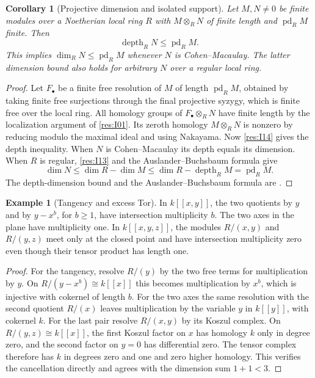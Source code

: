 \documentclass[11pt,oneside,openany]{book}
\newtheorem{corollary}[theorem]{Corollary}
\theoremstyle{definition}
\newtheorem{example}[theorem]{Example}
\theoremstyle{remark}
\begin{document}
\begin{corollary}[Projective dimension and isolated support]\label{res:I15}
Let \(M,N\ne 0\) be finite modules over a Noetherian local
ring \(R\) with \(M\otimes_R N\) of finite length and
\(\operatorname{pd}_R M\) finite. Then
\[
 \operatorname{depth}_R N\le \operatorname{pd}_R M .
\]
This implies \(\dim_R N\le\operatorname{pd}_R M\) whenever
\(N\) is Cohen--Macaulay. The latter dimension bound also
holds for arbitrary \(N\) over a regular local ring.
\end{corollary}
\begin{proof}
Let \(F_\bullet\) be a finite free resolution of \(M\) of
length \(\operatorname{pd}_R M\), obtained by taking finite free
surjections through the final projective syzygy, which is finite
free over the local ring. All homology groups of
\(F_\bullet\otimes_R N\) have finite length by the localization
argument of \ref{res:I01}. Its zeroth homology \(M\otimes_R N\)
is nonzero by reducing modulo the maximal ideal and using
Nakayama. Now \ref{res:I14} gives the depth inequality.
When \(N\) is Cohen--Macaulay its depth equals its dimension.
When \(R\) is regular, \ref{res:I13} and the
Auslander--Buchsbaum formula give
\[
 \dim N\le\dim R-\dim M
          \le\dim R-\operatorname{depth}_R M
          =\operatorname{pd}_R M.
\]
The depth-dimension bound and the Auslander--Buchsbaum formula
are \cite[DP-02 and DP-13]{core}.
\end{proof}

\begin{example}[Tangency and excess Tor]\label{res:I16}
In \(k[[x,y]]\), the two quotients by \(y\) and by \(y-x^b\),
for \(b\ge1\), have intersection multiplicity \(b\). The
two axes in the plane have multiplicity one. In
\(k[[x,y,z]]\), the modules \(R/(x,y)\) and \(R/(y,z)\)
meet only at the closed point and have intersection
multiplicity zero even though their tensor product has length
one.
\end{example}
\begin{proof}
For the tangency, resolve \(R/(y)\) by the two free terms for
multiplication by \(y\). On \(R/(y-x^b)\cong k[[x]]\) this
becomes multiplication by \(x^b\), which is injective with
cokernel of length \(b\). For the two axes the same resolution
with the second quotient \(R/(x)\) leaves multiplication by
the variable \(y\) in \(k[[y]]\), with cokernel \(k\).
For the last pair resolve \(R/(x,y)\) by its Koszul
complex. On \(R/(y,z)\cong k[[x]]\), the first Koszul
factor on \(x\) has homology \(k\) only in degree zero,
and the second factor on \(y=0\) has differential zero.
The tensor complex therefore has \(k\) in degrees zero
and one and zero higher homology. This verifies the
cancellation directly and agrees with the dimension sum
\(1+1<3\).
\end{proof}
\end{document}
